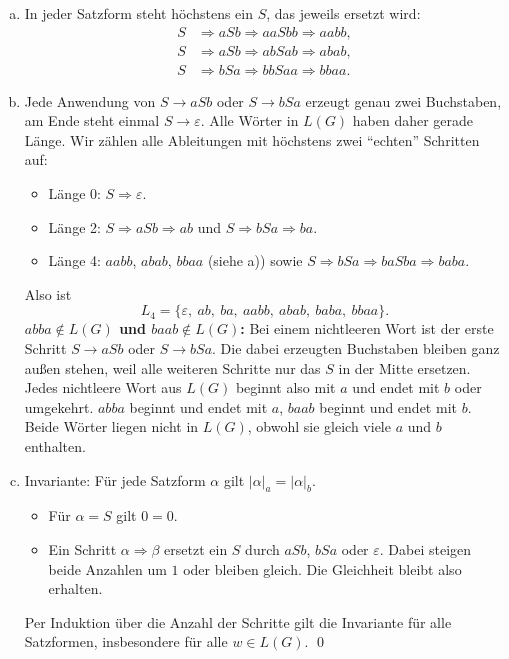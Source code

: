 \begin{loesung}
\begin{enumerate}[a)]
  \item In jeder Satzform steht höchstens ein $S$, das jeweils ersetzt wird:
  \begin{align*}
    S &\Rightarrow aSb \Rightarrow aaSbb \Rightarrow aabb,\\
    S &\Rightarrow aSb \Rightarrow abSab \Rightarrow abab,\\
    S &\Rightarrow bSa \Rightarrow bbSaa \Rightarrow bbaa.
  \end{align*}

  \item Jede Anwendung von $S\to aSb$ oder $S\to bSa$ erzeugt genau zwei Buchstaben, am Ende steht einmal $S\to\varepsilon$. Alle Wörter in $L(G)$ haben daher gerade Länge. Wir zählen alle Ableitungen mit höchstens zwei \enquote{echten} Schritten auf:
  \begin{itemize}
    \item Länge 0: $S\Rightarrow\varepsilon$.
    \item Länge 2: $S\Rightarrow aSb\Rightarrow ab$ und $S\Rightarrow bSa\Rightarrow ba$.
    \item Länge 4: $aabb$, $abab$, $bbaa$ (siehe a)) sowie $S\Rightarrow bSa\Rightarrow baSba\Rightarrow baba$.
  \end{itemize}
  Also ist
  \[L_4=\{\varepsilon,\ ab,\ ba,\ aabb,\ abab,\ baba,\ bbaa\}.\]
  \textbf{$abba\notin L(G)$ und $baab\notin L(G)$:} Bei einem nichtleeren Wort ist der erste Schritt $S\to aSb$ oder $S\to bSa$. Die dabei erzeugten Buchstaben bleiben ganz außen stehen, weil alle weiteren Schritte nur das $S$ in der Mitte ersetzen. Jedes nichtleere Wort aus $L(G)$ beginnt also mit $a$ und endet mit $b$ oder umgekehrt. $abba$ beginnt und endet mit $a$, $baab$ beginnt und endet mit $b$. Beide Wörter liegen nicht in $L(G)$, obwohl sie gleich viele $a$ und $b$ enthalten.

  \item Invariante: Für jede Satzform $\alpha$ gilt $|\alpha|_a=|\alpha|_b$.
  \begin{itemize}
    \item Für $\alpha=S$ gilt $0=0$.
    \item Ein Schritt $\alpha\Rightarrow\beta$ ersetzt ein $S$ durch $aSb$, $bSa$ oder $\varepsilon$. Dabei steigen beide Anzahlen um $1$ oder bleiben gleich. Die Gleichheit bleibt also erhalten.
  \end{itemize}
  Per Induktion über die Anzahl der Schritte gilt die Invariante für alle Satzformen, insbesondere für alle $w\in L(G)$. \qed


\end{enumerate}
\end{loesung}
